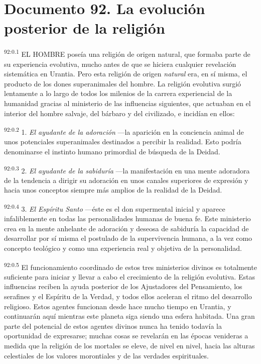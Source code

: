 \documentclass[twoside, 11pt]{book}
\begin{document}
\chapter{Documento 92. La evolución posterior de la religión}
\par
\textsuperscript{92:0.1} EL HOMBRE poseía una religión de origen natural, que formaba parte de su experiencia evolutiva, mucho antes de que se hiciera cualquier revelación sistemática en Urantia. Pero esta religión de origen \textit{natural} era, en sí misma, el producto de los dones superanimales del hombre. La religión evolutiva surgió lentamente a lo largo de todos los milenios de la carrera experiencial de la humanidad gracias al ministerio de las influencias siguientes, que actuaban en el interior del hombre salvaje, del bárbaro y del civilizado, e incidían en ellos:

\par
\textsuperscript{92:0.2} 1. \textit{El ayudante de la adoración} ---la aparición en la conciencia animal de unos potenciales superanimales destinados a percibir la realidad. Esto podría denominarse el instinto humano primordial de búsqueda de la Deidad.

\par
\textsuperscript{92:0.3} 2. \textit{El ayudante de la sabiduría} ---la manifestación en una mente adoradora de la tendencia a dirigir su adoración en unos canales superiores de expresión y hacia unos conceptos siempre más amplios de la realidad de la Deidad.

\par
\textsuperscript{92:0.4} 3. \textit{El Espíritu Santo} ---éste es el don supermental inicial y aparece infaliblemente en todas las personalidades humanas de buena fe. Este ministerio crea en la mente anhelante de adoración y deseosa de sabiduría la capacidad de desarrollar por sí misma el postulado de la supervivencia humana, a la vez como concepto teológico y como una experiencia real y objetiva de la personalidad.

\par
\textsuperscript{92:0.5} El funcionamiento coordinado de estos tres ministerios divinos es totalmente suficiente para iniciar y llevar a cabo el crecimiento de la religión evolutiva. Estas influencias reciben la ayuda posterior de los Ajustadores del Pensamiento, los serafines y el Espíritu de la Verdad, y todos ellos aceleran el ritmo del desarrollo religioso. Estos agentes funcionan desde hace mucho tiempo en Urantia, y continuarán aquí mientras este planeta siga siendo una esfera habitada. Una gran parte del potencial de estos agentes divinos nunca ha tenido todavía la oportunidad de expresarse; muchas cosas se revelarán en las épocas venideras a medida que la religión de los mortales se eleve, de nivel en nivel, hacia las alturas celestiales de los valores morontiales y de las verdades espirituales.
\end{document}
